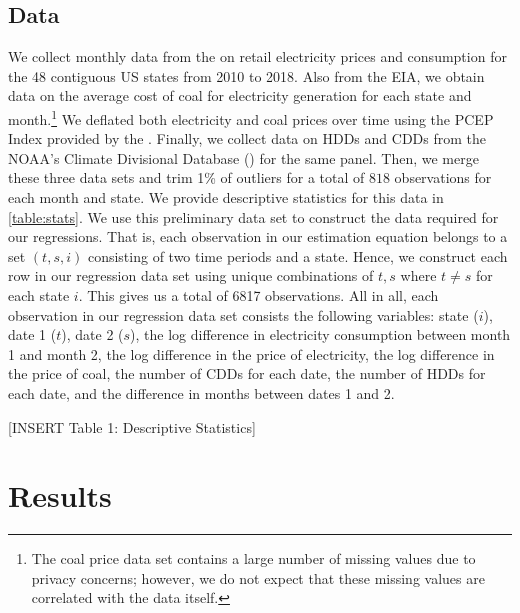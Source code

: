 \documentclass[11pt,a4paper,leqno]{extarticle}
\begin{document}
	\noindent
	\subsection{Data}
	
	
	We collect monthly data from the \cite{EIANetgen} on retail electricity prices and consumption for the 48 contiguous US states from 2010 to 2018. Also from the EIA, we obtain data on the average cost of coal for electricity generation for each state and month.\footnote{ The coal price data set contains a large number of missing values due to privacy concerns; however, we do not expect that these missing values are correlated with the data itself.} We deflated both electricity and coal prices over time using the PCEP Index provided by the  \cite{USBEA}. Finally, we collect data on HDDs and CDDs from the NOAA's Climate Divisional Database (\citeyear{nCLIMDIV}) for the same panel. Then, we merge these three data sets and trim 1\% of outliers for a total of $818$ observations for each month and state. We provide descriptive statistics for this data in \autoref{table:stats}. We use this preliminary data set to construct the data required for our regressions. That is, each observation in our estimation equation belongs to a set $(t,s,i)$ consisting of two time periods and a state. Hence, we construct each row in our regression data set using unique combinations of $t,s$ where $t \neq s$ for each state $i$. This gives us a total of 6817 observations.  All in all, each observation in our regression data set consists the following variables: state ($i$), date 1 ($t$), date 2 ($s$), the log difference in electricity consumption between month 1 and month 2, the log difference in the price of electricity, the log difference in the price of coal, the number of CDDs for each date, the number of HDDs for each date, and the difference in months between dates 1 and 2. 
	
	\vspace{0.15in}
	\begin{center}
		[INSERT Table 1: Descriptive Statistics]
	\end{center}
	\vspace{0.15in}
	
	
	
	
	\section{Results}
	\label{sec:results}
	
	
	
	
	
\end{document}
